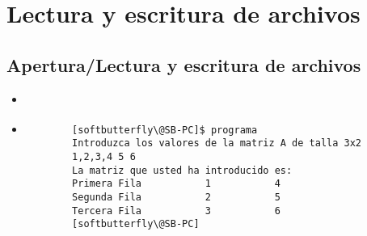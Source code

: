 
\section{Lectura y escritura de archivos}  


\subsection{Apertura/Lectura y escritura de archivos}

\begin{frame}[fragile]{} 
    \begin{itemize}[<+(0)->]
        \item [] \textbf{} 
        \item 
        \vspace{0.1cm}
        \begin{verbatim}
        [softbutterfly\@SB-PC]$ programa    
        Introduzca los valores de la matriz A de talla 3x2
        1,2,3,4 5 6
        La matriz que usted ha introducido es:
        Primera Fila           1           4
        Segunda Fila           2           5
        Tercera Fila           3           6
        [softbutterfly\@SB-PC]  
        \end{verbatim}
    \end{itemize}
\end{frame}